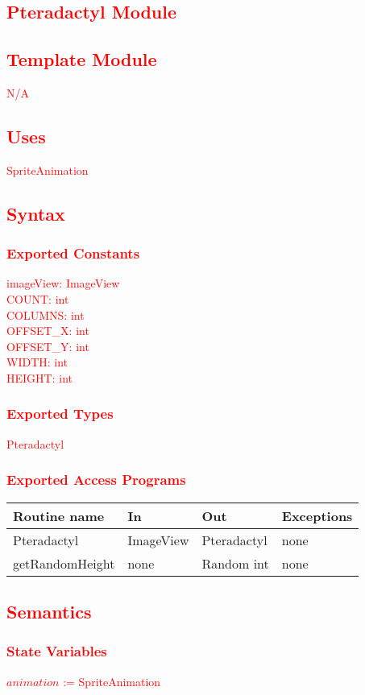 \documentclass[12pt, titlepage]{article}
\begin{document}
\textcolor{red}{
\section {Pteradactyl Module}
\subsection{Template Module}
N/A
\subsection {Uses}
SpriteAnimation
\subsection {Syntax}
\subsubsection{Exported Constants}
imageView: ImageView\\
COUNT: int\\
COLUMNS: int\\
OFFSET\_X: int\\
OFFSET\_Y: int\\
WIDTH: int\\
HEIGHT: int\\
\subsubsection {Exported Types}
Pteradactyl
\subsubsection {Exported Access Programs}
\begin{tabular}{| l | l | l | l |}
\hline
\textbf{Routine name} & \textbf{In} & \textbf{Out} & \textbf{Exceptions}\\
\hline
Pteradactyl & ImageView & Pteradactyl & none\\
\hline
getRandomHeight & none & Random int & none\\
\hline
\end{tabular}
\subsection {Semantics}
\subsubsection {State Variables}
$animation$ := SpriteAnimation
}
\end{document}
